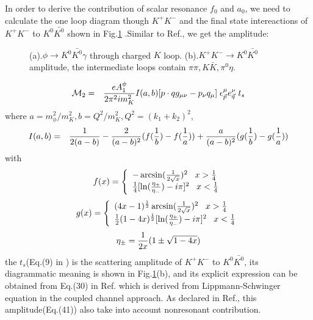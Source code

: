 In order to derive the contribution of scalar resonance $f_0$ and $a_0$,
we need to calculate the one loop diagram though $K^+K^-$ and the final
state intereactions of $K^+K^-$ to $K^0 \bar{K^0}$ shown in
Fig.\ref{figure:2} .Similar to Ref.\cite{b6}, we get the amplitude:
\begin{figure}[hpt]
   \centering
   \caption{(a).$\phi \to K^0 \bar {K^0} \gamma$ through charged $K$ loop.
(b).$K^+K^- \to K^0 \bar{K^0}$ amplitude, the intermediate
loops contain $\pi \pi, K\bar K, \pi^0 \eta$. 
}
   \label{figure:2}
\end{figure}
\begin{eqnarray}
{\cal M}_2&=&\frac{eA_1^\phi}{2\pi^2 i m_K^2}I(a,b)
[p\cdot q g_{\mu\nu}-p_\nu q_\mu]{\;}
\epsilon^{\mu}_{\vec p}e^{\nu}_{\vec q} {\;}
t_s
\end{eqnarray}
where
$a={m_\phi^2}/{m_K^2},b={Q^2}/{m_K^2},Q^2=(k_1+k_2)^2$,
\begin{eqnarray}
I(a,b)&=&\frac{1}{2(a-b)}-\frac{2}{(a-b)^2}(f({1\over b})-f({1\over a}))
                         +\frac{a}{(a-b)^2}(g({1\over b})-g({1\over a}))
\end{eqnarray}
with
\[
f(x)=\left\{
\begin{array}{l}
-\arcsin(\frac{1}{2\sqrt{x}})^2 {\;\;\;} x>{1\over 4} \\
{1\over 4}[\ln(\frac{\eta_+}{\eta_-})-i\pi ]^2 {\;\;\;} x<{1\over 4}
\end{array}
\right.
\]
\[   
g(x)=\left\{
\begin{array}{l}
(4x-1)^{1\over 2}\arcsin(\frac{1}{2\sqrt{x}})^2 {\;\;\;} x>{1\over 4} \\
{1\over 2}(1-4x)^{1\over 2}[\ln(\frac{\eta_+}{\eta_-})-i\pi ]^2 {\;\;\;}
x<{1\over 4}
\end{array}
\right.
\]
\begin{equation}
\eta_\pm={1\over{2x}}(1\pm \sqrt{1-4x})
\end{equation}
the $t_s$(Eq.(9) in \cite{b6}) is the scattering amplitude of $K^+K^-$ to
$K^0 \bar {K^0}$, its diagrammatic meaning is shown in
Fig.\ref{figure:2}(b), and its explicit expression can be obtained from
Eq.(30) in Ref.\cite{b7} which is derived from Lippmann-Schwinger equation
in the coupled channel approach. As declared in Ref.\cite{b6}, this
amplitude(Eq.(41)) also take into account nonresonant contribution. 

